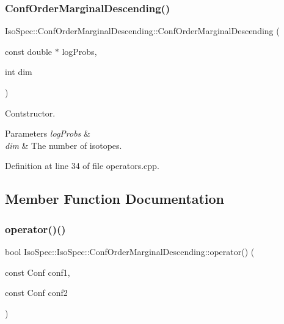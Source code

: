\subsubsection{\texorpdfstring{Conf\+Order\+Marginal\+Descending()}{ConfOrderMarginalDescending()}}
{\footnotesize\ttfamily Iso\+Spec\+::\+Conf\+Order\+Marginal\+Descending\+::\+Conf\+Order\+Marginal\+Descending (\begin{DoxyParamCaption}\item[{const double $\ast$}]{log\+Probs,  }\item[{int}]{dim }\end{DoxyParamCaption})}



Contstructor. 


\begin{DoxyParams}{Parameters}
{\em log\+Probs} & \\
\hline
{\em dim} & The number of isotopes. \\
\hline
\end{DoxyParams}


Definition at line 34 of file operators.\+cpp.



\subsection{Member Function Documentation}
\mbox{\label{class_iso_spec_1_1_iso_spec_1_1_conf_order_marginal_descending_a24753a23a4484aa1247606e15362dee0}} 
\subsubsection{\texorpdfstring{operator()()}{operator()()}}
{\footnotesize\ttfamily bool Iso\+Spec\+::\+Iso\+Spec\+::\+Conf\+Order\+Marginal\+Descending\+::operator() (\begin{DoxyParamCaption}\item[{const Conf}]{conf1,  }\item[{const Conf}]{conf2 }\end{DoxyParamCaption})\hspace{0.3cm}{\ttfamily [inline]}}



